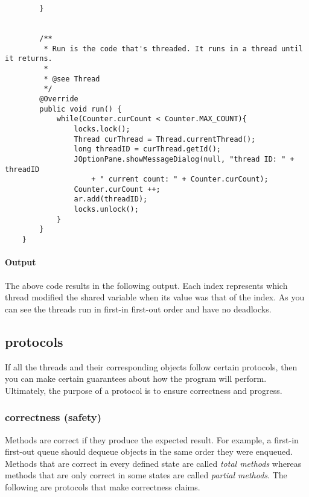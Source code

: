 \documentclass[titlepage]{article}
\begin{document}
\begin{singlespace}
\begin{lstlisting}
        }
    
    
        /**
         * Run is the code that's threaded. It runs in a thread until it returns.
         * 
         * @see Thread
         */
        @Override
        public void run() {
            while(Counter.curCount < Counter.MAX_COUNT){
                locks.lock();
                Thread curThread = Thread.currentThread();
                long threadID = curThread.getId();
                JOptionPane.showMessageDialog(null, "thread ID: " + threadID
                    + " current count: " + Counter.curCount);
                Counter.curCount ++;
                ar.add(threadID);
                locks.unlock();
            }   
        }
    }
\end{lstlisting}
\end{singlespace}

\paragraph*{Output}

The above code results in the following output. Each index represents which thread modified the shared variable when its value was that of the index. As you can see the threads run in first-in first-out order and have no deadlocks.

\begin{python}
[16, 17, 18, 19, 16, 17, 18, 19, 16, 17, 18,
19, 16, 17, 18, 19,16, 17, 18, 19, 16, 17, 18]    
\end{python}





\subsection{protocols}

If all the threads and their corresponding objects follow certain protocols, then you can make certain guarantees about how the program will perform. Ultimately, the purpose of a protocol is to ensure correctness and progress.

\subsubsection{correctness (safety)}

Methods are correct if they produce the expected result. For example, a first-in first-out queue should dequeue objects in the same order they were enqueued. Methods that are correct in every defined state are called \textit{total methods} whereas methods that are only correct in some states are called \textit{partial methods}. The following are protocols that make correctness claims.
\end{document}
